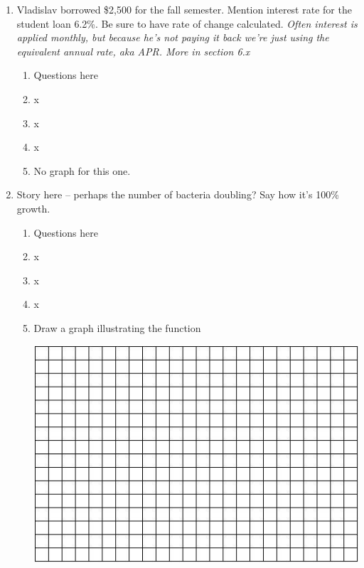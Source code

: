 \begin{enumerate}
\newpage

\item Vladislav borrowed \$2,500 for the fall semester.  Mention interest rate for the student loan 6.2\%.  Be sure to have rate of change calculated.  \emph{Often interest is applied monthly, but because he's not paying it back we're just using the equivalent annual rate, aka APR.  More in section 6.x}

\begin{enumerate}
\item Questions here \vfill
\item x \vfill
\item x \vfill
\item x \vfill
\item  No graph for this one. \vfill
\end{enumerate}

\newpage

\item Story here -- perhaps the number of bacteria doubling?  Say how it's 100\% growth.

\begin{enumerate}
\item Questions here \vfill
\item x \vfill
\item x \vfill
\item x \vfill
\item Draw a graph illustrating the function

\begin{center}
 {\includegraphics [width = 6in] {GraphPaper}}
\end{center}
\end{enumerate}

\end{enumerate}

